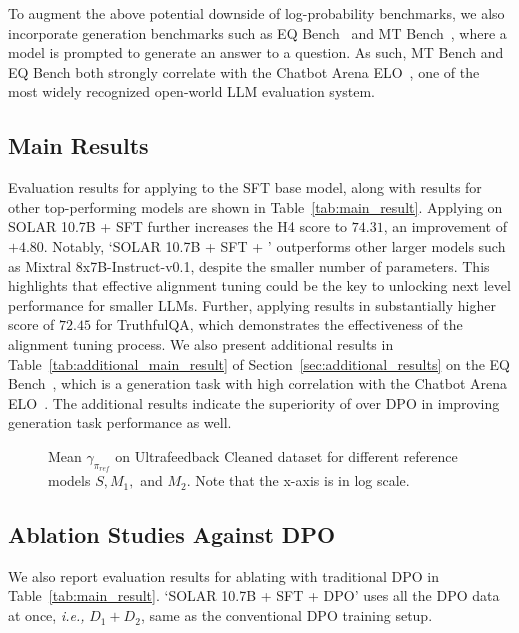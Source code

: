 To augment the above potential downside of log-probability benchmarks, we also incorporate generation benchmarks such as EQ Bench~\cite{paech2023eq} and MT Bench~\cite{zheng2023judging}, where a model is prompted to generate an answer to a question.
As such, MT Bench and EQ Bench both strongly correlate with the Chatbot Arena ELO~\cite{zheng2023judging,chiang2024chatbotarenaopenplatform}, one of the most widely recognized open-world LLM evaluation system.

\subsection{Main Results}
Evaluation results for applying \method to the SFT base model, along with results for other top-performing models are shown in Table~\ref{tab:main_result}.
Applying \method on SOLAR 10.7B + SFT further increases the H4 score to $74.31$, an improvement of $+4.80$.
Notably, `SOLAR 10.7B + SFT + \method' outperforms other larger models such as Mixtral 8x7B-Instruct-v0.1, despite the smaller number of parameters.
This highlights that effective alignment tuning could be the key to unlocking next level performance for smaller LLMs.
Further, applying \method results in substantially higher score of $72.45$ for TruthfulQA, which demonstrates the effectiveness of the alignment tuning process. 
We also present additional results in Table~\ref{tab:additional_main_result} of Section~\ref{sec:additional_results} on the EQ Bench~\cite{paech2023eq}, which is a generation task with high correlation with the Chatbot Arena ELO~\cite{zheng2023judging}.
The additional results indicate the superiority of \method over DPO in improving generation task performance as well.

\begin{figure}[t!]
    \centering
    \caption{Mean $\gamma_{\pi_{ref}}$ on Ultrafeedback Cleaned dataset for different reference models $S,M_1,$ and $M_2$. Note that the x-axis is in log scale.}
    \label{fig:logratio}
\end{figure}
\subsection{Ablation Studies Against DPO}
We also report evaluation results for ablating \method with traditional DPO in Table~\ref{tab:main_result}.
`SOLAR 10.7B + SFT + DPO' uses all the DPO data at once, \textit{i.e.,} $D_1 + D_2$, same as the conventional DPO training setup.

